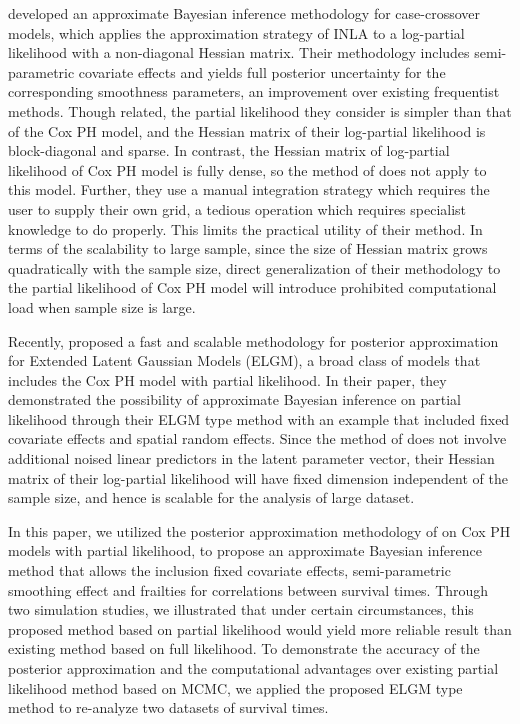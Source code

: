 \documentclass[ba]{imsart}
\begin{document}
\cite{casecross} developed an approximate Bayesian inference methodology for case-crossover models, which applies the approximation strategy of INLA to a log-partial likelihood with a non-diagonal Hessian matrix. Their methodology includes semi-parametric covariate effects and yields full posterior uncertainty for the corresponding smoothness parameters, an improvement over existing frequentist methods. Though related, the partial likelihood they consider is simpler than that of the Cox PH model, and the Hessian matrix of their log-partial likelihood is block-diagonal and sparse. In contrast, the Hessian matrix of log-partial likelihood of Cox PH model is fully dense, so the method of \cite{casecross} does not apply to this model. Further, they use a manual integration strategy which requires the user to supply their own grid, a tedious operation which requires specialist knowledge to do properly. This limits the practical utility of their method. In terms of the scalability to large sample, since the size of Hessian matrix grows quadratically with the sample size, direct generalization of their methodology to the partial likelihood of Cox PH model will introduce prohibited computational load when sample size is large.

Recently, \cite{ELGM} proposed a fast and scalable methodology for posterior approximation for Extended Latent Gaussian Models (ELGM), a broad class of models that includes the Cox PH model with partial likelihood. In their paper, they demonstrated the possibility of approximate Bayesian inference on partial likelihood through their ELGM type method with an example that included fixed covariate effects and spatial random effects. Since the method of \cite{ELGM} does not involve additional noised linear predictors in the latent parameter vector, their Hessian matrix of their log-partial likelihood will have fixed dimension independent of the sample size, and hence is scalable for the analysis of large dataset. 

In this paper, we utilized the posterior approximation methodology of \cite{ELGM} on Cox PH models with partial likelihood, to propose an approximate Bayesian inference method that allows the inclusion fixed covariate effects, semi-parametric smoothing effect and frailties for correlations between survival times. Through two simulation studies, we illustrated that under certain circumstances, this proposed method based on partial likelihood would yield more reliable result than existing method based on full likelihood. To demonstrate the accuracy of the posterior approximation and the computational advantages over existing partial likelihood method based on MCMC, we applied the proposed ELGM type method to re-analyze two datasets of survival times.
\end{document}
